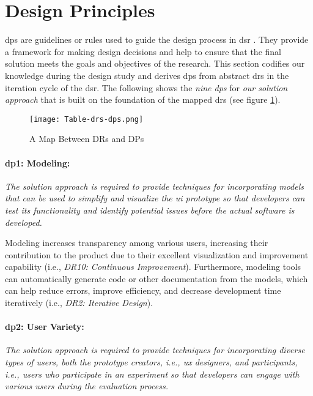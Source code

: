 \section{Design Principles}
\label{design:section:designprinciple}
\ac{dp}s are guidelines or rules used to guide the design process in \ac{dsr} \cite{misc:dsr:henver}. 
They provide a framework for making design decisions \cite{paper:designprinciple:gregor} and help to ensure that the final solution meets the goals and objectives of the research. 
This section codifies our knowledge during the design study and derives \ac{dp}s from abstract \ac{dr}s in the iteration cycle of the \ac{dsr}.
The following shows the \textit{nine \ac{dp}s} for \textit{our solution approach} that is built on the foundation of the mapped \ac{dr}s (see figure \ref{fig:design:table-drs-dps}). 
\begin{figure}[htbp!]
  \centering    
  \texttt{[image: Table-drs-dps.png]}
  \caption[A Map Between DRs and DPs]{A Map Between DRs and DPs}
  \label{fig:design:table-drs-dps}
\end{figure}
\clearpage

\paragraph{\ac{dp}1: Modeling:} \textit{The solution approach is required to provide techniques for incorporating models that can be used to simplify and visualize the \ac{ui} prototype so that developers can test its functionality and identify potential issues before the actual software is developed.}

Modeling increases transparency among various users, increasing their contribution to the product due to their excellent visualization and improvement capability (i.e., \textit{DR10: Continuous Improvement}).
Furthermore, modeling tools can automatically generate code or other documentation from the models, which can help reduce errors, improve efficiency, and decrease development time iteratively (i.e., \textit{DR2: Iterative Design}).

\paragraph{\ac{dp}2: User Variety:} \textit{The solution approach is required to provide techniques for incorporating diverse types of users, both the prototype creators, i.e., \ac{ux} designers, and participants, i.e., users who participate in an experiment so that developers can engage with various users during the evaluation process.}

